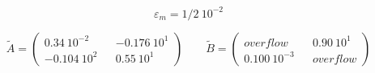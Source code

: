 \[ \varepsilon_m=1/2 \ 10^{-2} \]

\medskip
\[
 \widetilde A=\left(
\begin{array}{ccc}
0.34\ 10^{-2} && -0.176\ 10^1 \\
-0.104\ 10^{2} && 0.55\ 10^{1}
\end{array} \right) \quad \quad
 \widetilde B=\left(
\begin{array}{ccc}
overflow & & 0.90\ 10^1 \\
0.100\ 10^{-3} &  & overflow
\end{array}
\right)
\]
